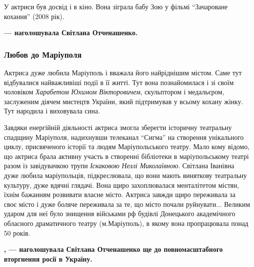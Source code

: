 У актриси був досвід і в кіно. Вона зіграла бабу Зою у фільмі \enquote{Зачароване
кохання} (2008 рік). 

\begin{leftbar}
	\begingroup
		\bfseries
{} — наголошувала Світлана Отченашенко. 
	\endgroup
\end{leftbar}


\subsubsection{Любов до Маріуполя}

Актриса дуже любила Маріуполь і вважала його найріднішим містом. Саме тут
відбувалися найважливіші події в її житті. Тут вона познайомилася і зі своїм
чоловіком \emph{Харабетом Юхимом Вікторовичем}, скульптором і медальєром, заслуженим
діячем мистецтв України, який підтримував у всьому кохану жінку. Тут народила і
виховувала сина. 


Завдяки енергійній діяльності актриса змогла зберегти історичну театральну
спадщину Маріуполя, надихнувши телеканал \enquote{Сигма} на створення унікального
циклу, присвяченого історії та людям Маріупольського театру. Мало кому відомо,
що актриса брала активну участь в створенні бібліотеки в маріупольському театрі
разом із завідувачкою трупи \emph{Іскаковою Неллі Миколаївною}. Світлана Іванівна дуже
любила маріупольців, підкреслювала, що вони мають виняткову театральну
культуру, дуже вдячні глядачі. Вона щиро захоплювалася менталітетом містян,
їхнім бажанням розвивати власне місто. Актриса завжди щиро переживала за своє
місто і дуже боляче переживала за те, що місто почали руйнувати... Великим ударом
для неї було знищення військами рф будівлі Донецького академічного обласного
драматичного театру (м.Маріуполь), в якому вона пропрацювала понад 50 років. 

\begin{leftbar}
	\begingroup
		\bfseries
{}, — наголошувала Світлана Отченашенко ще до
повномасштабного вторгнення росії в Україну. 
	\endgroup
\end{leftbar}


